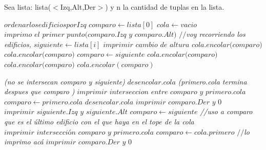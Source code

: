 \documentclass{article}
\begin{document}
Sea lista: lista($<$Izq,Alt,Der$>$) y n la cantidad de tuplas en la lista.


\vspace{0.4cm}
\begin{algorithmic}[1]
	\State $ordenar los edificios por Izq$
	\State $comparo\gets lista[0]$
	\State $cola\gets vacio$
	\State $\textit{imprimo el primer punto(comparo.Izq y comparo.Alt)}$
	 \textit{$//$voy recorriendo los edificios, \color{red}{si hay 0 edificios que hago?} \color{black}}
		\State $siguiente\gets lista[i]$
				\State $\textit{imprimir cambio de altura}$
					\State $\textit{cola.encolar(comparo)}$
				\Else
					\State$\textit{cola.encolar(comparo)}$						
					\EndIf			
				\EndIf
					\State $comparo\gets siguiente$
			\EndIf
					\State $\textit{cola.encolar(comparo)}$
				\Else
					\State$\textit{cola.encolar(comparo)}$
					\EndIf			
				\EndIf
			\EndIf
				\State $cola.encolar(comparo)$
			\EndIf
			
		\EndIf \textit{(no se intersecan comparo y siguiente\color{red}{*4})}
				\State $\textit{desencolar.cola}$
				\Else \textit{(primero.cola termina despues que comparo \color{red}{*6})}
				\State $\textit{imprimir interseccion entre comparo y primero.cola}$
				\State $comparo\gets primero.cola$
				\State $\textit{desencolar.cola}$
				\EndIf
			\EndWhile
		\State $\textit{imprimir comparo.Der y 0 }$
		\State $\textit{imprimir siguiente.Izq y siguiente.Alt}$
		\State $comparo\gets siguiente$
		\EndIf
	\textit{//uso a comparo que es el último edificio con el que haya en el tope de la cola}
		\State $\textit{imprimir intersección comparo y primero.cola}$
		\State $comparo\gets cola.primero$
	\EndIf
	\newline
	\textit{$//$lo imprimo acá}
	\State $\textit{imprimir comparo.Der y 0}$
\EndProcedure
\end{algorithmic}
\end{document}
